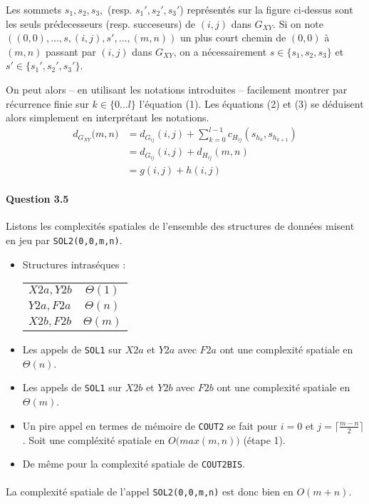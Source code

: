  

Les sommets $s_1,s_2,s_3,$ (resp. $s_1',s_2',s_3'$) repr\'esent\'es
sur la figure ci-dessus sont les seuls pr\'edecesseurs
(resp. succeseurs) de $(i,j)$ dans $G_{XY}$. Si on note
$((0,0),\ldots,s,(i,j),s',\ldots,(m,n))$ un plus court chemin de
$(0,0)$ \`a $(m,n)$ passant par $(i,j)$ dans $G_{XY}$, on a
n\'ecessairement $s\in\{s_1,s_2,s_3\}$ et $s'\in\{s_1',s_2',s_3'\}$.
\nopagebreak

On peut alors -- en utilisant les notations introduites -- facilement
montrer par r\'ecurrence finie sur $k\in\{0\ldots l\}$ l'\'equation
(1). Les \'equations (2) et (3) se d\'eduisent alors simplement en
interpr\'etant les notations.
\begin{align}
  d_{G_{XY}}\big(m,n\big)
  &=d_{G_{ij}}(i,j)+\sum_{k=0}^{l-1}c_{H_{ij}}(s_{h_k},s_{h_{k+1}})\\
  &=d_{G_{ij}}(i,j)+d_{H_{ij}}(m,n)\\
  &=g(i,j)+h(i,j)
\end{align}

\paragraph{Question 3.5}
Listons les complexit\'es spatiales de l'ensemble des structures de
donn\'ees misent en jeu par \verb'SOL2(0,0,m,n)'.\\
\begin{itemize}
\item Structures intras\'eques :
\begin{table*}[h]
  \centering
\begin{tabular}{l|c}
  $X2a,Y2b$&$\Theta(1)$\\
  $Y2a,F2a$&$\Theta(n)$\\
  $X2b,F2b$&$\Theta(m)$\\
\end{tabular}
\end{table*}
\item Les appels de \verb'SOL1' sur $X2a$ et $Y2a$ avec $F2a$ ont une
  complexit\'e spatiale en $\Theta(n)$.
\item Les appels de \verb'SOL1' sur $X2b$ et $Y2b$ avec $F2b$ ont une
  complexit\'e spatiale en $\Theta(m)$.
\item Un pire appel en termes de m\'emoire de \verb'COUT2' se fait
  pour $i=0$ et $j=\lceil\frac{m-n}{2}\rceil$. Soit une compl\'exit\'e
  spatiale en $O\big(max(m,n)\big)$ (\'etape 1).
\item De m\^eme pour la complexit\'e spatiale de \verb'COUT2BIS'.
\end{itemize}
\paragraph{}
La complexit\'e spatiale de l'appel \verb'SOL2(0,0,m,n)' est donc bien
en $O(m+n)$.

